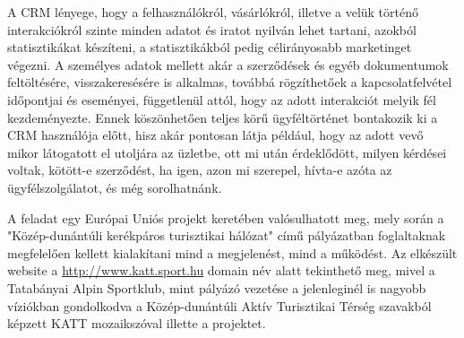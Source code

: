 A CRM lényege, hogy a felhasználókról, vásárlókról, illetve a velük történő interakciókról szinte minden adatot és iratot nyilván lehet tartani, azokból statisztikákat készíteni, a statisztikákból pedig célirányosabb marketinget végezni. A személyes adatok mellett akár a szerződések és egyéb dokumentumok feltöltésére, visszakeresésére is alkalmas, továbbá rögzíthetőek a kapcsolatfelvétel időpontjai és eseményei, függetlenül attól, hogy az adott interakciót melyik fél kezdeményezte. Ennek köszönhetően teljes körű ügyféltörténet bontakozik ki a CRM használója előtt, hisz akár pontosan látja például, hogy az adott vevő mikor látogatott el utoljára az üzletbe, ott mi után érdeklődött, milyen kérdései voltak, kötött-e szerződést, ha igen, azon mi szerepel, hívta-e azóta az ügyfélszolgálatot, és még sorolhatnánk.





A feladat egy Európai Uniós projekt keretében valósulhatott meg, mely során a "Közép-dunántúli kerékpáros turisztikai hálózat" című pályázatban foglaltaknak megfelelően kellett kialakítani mind a megjelenést, mind a működést. Az elkészült website a \url{http://www.katt.sport.hu} domain név alatt tekinthető meg, mivel a Tatabányai Alpin Sportklub, mint pályázó vezetése a jelenleginél is nagyobb víziókban gondolkodva a Közép-dunántúli Aktív Turisztikai Térség szavakból képzett KATT mozaikszóval illette a projektet.

